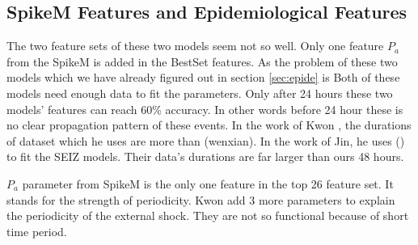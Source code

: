 \begin{table}[!h]
\centering
{}
\caption{Rank of Part of User Feature}
\label{userfeaturerank}
\end{table}
\subsection{SpikeM Features and Epidemiological Features}
The two feature sets of these two models seem not so well. 
Only one feature $P_a$ from the SpikeM is added in the BestSet features. 
As the problem of these two models which we have already figured out in section \ref{sec:epide} is Both of these models need enough data to fit the parameters. Only after 24 hours these two models' features can reach 60\% accuracy. In other words before 24 hour these is no clear propagation pattern of these events. In the work of Kwon \cite{kwon2013prominent}, the durations of dataset which he uses are more than (wenxian). In the work of Jin\cite{jin2013epidemiological}, he uses () to fit the SEIZ models. Their data's durations are far larger than ours 48 hours.
 
 $P_a$ parameter from SpikeM is the only one feature in the top 26 feature set. It stands for the strength of periodicity.  Kwon add 3 more parameters to explain the periodicity of the external shock. They are not so functional because of short time period.

\begin{table}[!h]
\centering
{}
 \caption{Rank of Part of SpikeM Features and Epidemiological Features}
\label{SPikemfeaturerank}

 \end{table}
 
